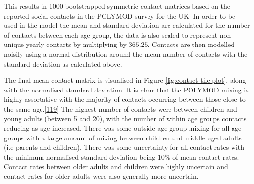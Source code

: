 \documentclass[11pt,twoside]{bristolthesis}
\begin{document}
  This results in 1000 bootstrapped symmetric contact matrices based on the reported social contacts in the POLYMOD survey for the UK. In order to be used in the model the mean and standard deviation are calculated for the number of contacts between each age group, the data is also scaled to represent non-unique yearly contacts by multiplying by \(365.25\). Contacts are then modelled noisily using a normal distribution around the mean number of contacts with the standard deviation as calculated above.
  
  The final mean contact matrix is visualised in Figure \ref{fig:contact-tile-plot}, along with the normalised standard deviation. It is clear that the POLYMOD mixing is highly assortative with the majority of contacts occurring between those close to the same age.{[}\protect\hyperlink{ref-Mossong2008}{119}{]} The highest number of contacts were between children and young adults (between 5 and 20), with the number of within age groups contacts reducing as age increased. There was some outside age group mixing for all age groups with a large amount of mixing between children and middle aged adults (i.e parents and children). There was some uncertainty for all contact rates with the minimum normalised standard deviation being 10\% of mean contact rates. Contact rates between older adults and children were highly uncertain and contact rates for older adults were also generally more uncertain.
  
\end{document}
